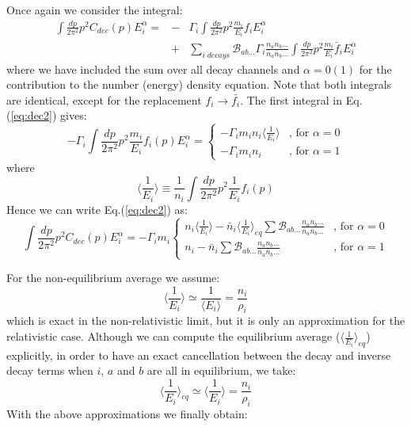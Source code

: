 \documentclass[preprint,notoc]{JHEP3}
\def\to{\rightarrow}
\def\to{\rightarrow}
\begin{document}
Once again we consider the integral:
\begin{eqnarray}
\int \frac{dp}{2 \pi^2} p^2 C_{dec}(p) E_i^{\alpha} = 
 & - & \Gamma_i \int \frac{dp}{2 \pi^2} p^2 \frac{m_i}{E_i} f_i E_i^{\alpha}
 \nonumber \\
 & + & \sum_{i \; decays} \mathcal{B}_{ab\ldots}
\Gamma_i \frac{n_a n_b \ldots}{\bar{n}_a \bar{n}_b \ldots} \int \frac{dp}{2 \pi^2}
p^2 \frac{m_i}{E_i} \bar{f}_{i} E_i^\alpha \label{eq:dec2}
\end{eqnarray}
where we have included the sum over all decay channels and $\alpha = 0 (1)$
for the contribution to the number (energy) density equation.
Note that both integrals are identical, except for the replacement
$f_i \to \bar{f_i}$. The first integral in Eq.(\ref{eq:dec2}) gives:
\begin{equation}
-\Gamma_i \int \frac{dp}{2 \pi^2} p^2 \frac{m_i}{E_i} f_i(p) E_i^{\alpha} =
\left\{ \begin{array}{rl} -\Gamma_i m_i n_i \langle \frac{1}{E_i} \rangle  & \mbox{, for $\alpha = 0$} \\
-\Gamma_i m_i n_i &\mbox{, for $\alpha = 1$}
\end{array} \right. \label{eq:dec1a}
\end{equation}
where
\begin{equation}
\langle \frac{1}{E_i} \rangle \equiv \frac{1}{n_i} \int \frac{dp}{2 \pi^2} p^2
\frac{1}{E_i} f_i(p)
\end{equation}
Hence we can write Eq.(\ref{eq:dec2}) as:
\begin{equation}
\int \frac{dp}{2 \pi^2} p^2 C_{dec}(p) E_i^{\alpha} = -\Gamma_i m_i 
\left\{ \begin{array}{ll} n_i \langle \frac{1}{E_i} \rangle - \bar{n}_i  \langle
\frac{1}{E_i}
\rangle_{eq} \sum \mathcal{B}_{ab\ldots}
 \frac{n_a n_b\ldots}{\bar{n}_a \bar{n}_b\ldots}  & \mbox{, for $\alpha = 0$}  \\
 n_i - \bar{n}_i \sum \mathcal{B}_{ab\ldots}
 \frac{n_a n_b\ldots}{\bar{n}_a \bar{n}_b\ldots}  & \mbox{, for $\alpha = 1$}
\end{array} \right. \label{eq:decfin}
\end{equation}


For the non-equilibrium average we assume:
\begin{equation}
\langle \frac{1}{E_i} \rangle \simeq \frac{1}{\langle E_i \rangle} =
\frac{n_i}{\rho_i}
\end{equation}
which is exact in the non-relativistic limit, but it is only an approximation
for the relativistic case.
Although we can compute the equilibrium average ($\langle
\frac{1}{E_i}\rangle_{eq}$)
explicitly, in order to have an exact cancellation between 
the decay and inverse decay terms when $i$, $a$ and $b$ are all in equilibrium,
we take:
\begin{equation}
\langle \frac{1}{E_i} \rangle_{eq} \simeq \langle \frac{1}{E_i} \rangle =
\frac{n_i}{\rho_i}
\end{equation}
With the above approximations we finally obtain:
\end{document}
